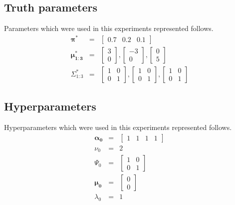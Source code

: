 \documentclass[a4paper]{article}
\begin{document}
	\subsection{Truth parameters}
	Parameters which were used in this experiments represented follows.
	\begin{eqnarray}
		\boldsymbol{\pi^*} &=& \left[ \begin{array}{ccc}
			0.7 & 0.2 & 0.1
		\end{array}
		\right]\\
		\boldsymbol{\mu^*_{1:3}} &=&
		\left[\begin{array}{c}
			3\\
			0
		\end{array}\right]
		,
		\left[\begin{array}{c}
			-3\\
			0
		\end{array}\right]
		,
		\left[\begin{array}{c}
			0\\
			5
		\end{array}\right]\\
		\Sigma^*_{1:3} &=&
		\left[\begin{array}{cc}
			1 & 0\\
			0 & 1
		\end{array}\right]
		,
		\left[\begin{array}{cc}
			1 & 0\\
			0 & 1
		\end{array}\right]
		, \left[\begin{array}{cc}
			1 & 0\\
			0 & 1
		\end{array}\right]
	\end{eqnarray}

	\subsection{Hyperparameters}
	Hyperparameters which were used in this experiments represented follows.
	\begin{eqnarray}
		\boldsymbol{\alpha_0} &=& \left[\begin{array}{cccc} 1 & 1 & 1 & 1\end{array}\right]\\
		\nu_0 &=& 2\\
		\Psi_0 &=& \left[\begin{array}{cc}
			1 & 0\\
			0 & 1
		\end{array}\right]\\
		\boldsymbol{\mu_0} &=& \left[\begin{array}{c}
			0\\
			0
		\end{array}\right]\\
		\lambda_0 &=& 1
	\end{eqnarray}
\end{document}
